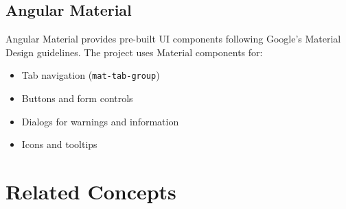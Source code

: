 \subsection{Angular Material}

Angular Material provides pre-built UI components following Google's Material Design guidelines. The project uses Material components for:
\begin{itemize}
    \item Tab navigation (\texttt{mat-tab-group})
    \item Buttons and form controls
    \item Dialogs for warnings and information
    \item Icons and tooltips
\end{itemize}

\section{Related Concepts}
\label{sec:related-concepts}




